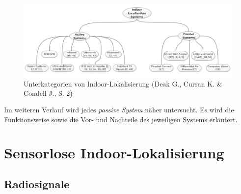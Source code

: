 \begin{figure}[H]
	\centering
	\includegraphics[scale=0.9]{pictures/indoor_loc}
	\caption{Unterkategorien von Indoor-Lokalisierung (Deak G.,  Curran K. \& Condell J., S. 2)}
\end{figure}

Im weiteren Verlauf wird jedes \textit{passive System} näher untersucht. Es wird die Funktionsweise sowie die Vor- und Nachteile des jeweiligen Systems erläutert.


\section{Sensorlose Indoor-Lokalisierung}
\subsection{Radiosignale}
